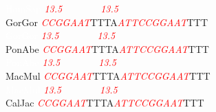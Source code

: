 \documentclass[11pt,twoside,reqno,a4paper]{article}
\begin{document}
{\textcolor{white}{HomSap	}\textit{\textcolor{red}{13.5}}\ \ \ \ \ \ \ \ \textit{\textcolor{red}{13.5}}\ \ \ \ \ \ \ \ \ \ \\
GorGor	\textit{\textcolor{red}{C}}\textit{\textcolor{red}{C}}\textit{\textcolor{red}{G}}\textit{\textcolor{red}{G}}\textit{\textcolor{red}{A}}\textit{\textcolor{red}{A}}\textit{\textcolor{red}{T}}TTTA\textit{\textcolor{red}{A}}\textit{\textcolor{red}{T}}\textit{\textcolor{red}{T}}\textit{\textcolor{red}{C}}\textit{\textcolor{red}{C}}\textit{\textcolor{red}{G}}\textit{\textcolor{red}{G}}\textit{\textcolor{red}{A}}\textit{\textcolor{red}{A}}\textit{\textcolor{red}{T}}TTT\\
\textcolor{white}{GorGor	}\textit{\textcolor{red}{13.5}}\ \ \ \ \ \ \ \ \textit{\textcolor{red}{13.5}}\ \ \ \ \ \ \ \ \ \ \\
PonAbe	\textit{\textcolor{red}{C}}\textit{\textcolor{red}{C}}\textit{\textcolor{red}{G}}\textit{\textcolor{red}{G}}\textit{\textcolor{red}{A}}\textit{\textcolor{red}{A}}\textit{\textcolor{red}{T}}TTTA\textit{\textcolor{red}{A}}\textit{\textcolor{red}{T}}\textit{\textcolor{red}{T}}\textit{\textcolor{red}{C}}\textit{\textcolor{red}{C}}\textit{\textcolor{red}{G}}\textit{\textcolor{red}{G}}\textit{\textcolor{red}{A}}\textit{\textcolor{red}{A}}\textit{\textcolor{red}{T}}TTT\\
\textcolor{white}{PonAbe	}\textit{\textcolor{red}{13.5}}\ \ \ \ \ \ \ \ \textit{\textcolor{red}{13.5}}\ \ \ \ \ \ \ \ \ \ \\
MacMul	\textit{\textcolor{red}{C}}\textit{\textcolor{red}{C}}\textit{\textcolor{red}{G}}\textit{\textcolor{red}{G}}\textit{\textcolor{red}{A}}\textit{\textcolor{red}{A}}\textit{\textcolor{red}{T}}TTTA\textit{\textcolor{red}{A}}\textit{\textcolor{red}{T}}\textit{\textcolor{red}{T}}\textit{\textcolor{red}{C}}\textit{\textcolor{red}{C}}\textit{\textcolor{red}{G}}\textit{\textcolor{red}{G}}\textit{\textcolor{red}{A}}\textit{\textcolor{red}{A}}\textit{\textcolor{red}{T}}TTT\\
\textcolor{white}{MacMul	}\textit{\textcolor{red}{13.5}}\ \ \ \ \ \ \ \ \textit{\textcolor{red}{13.5}}\ \ \ \ \ \ \ \ \ \ \\
CalJac	\textit{\textcolor{red}{C}}\textit{\textcolor{red}{C}}\textit{\textcolor{red}{G}}\textit{\textcolor{red}{G}}\textit{\textcolor{red}{A}}\textit{\textcolor{red}{A}}\textit{\textcolor{red}{T}}TTTA\textit{\textcolor{red}{A}}\textit{\textcolor{red}{T}}\textit{\textcolor{red}{T}}\textit{\textcolor{red}{C}}\textit{\textcolor{red}{C}}\textit{\textcolor{red}{G}}\textit{\textcolor{red}{G}}\textit{\textcolor{red}{A}}\textit{\textcolor{red}{A}}\textit{\textcolor{red}{T}}TTT\\
}
\end{document}
